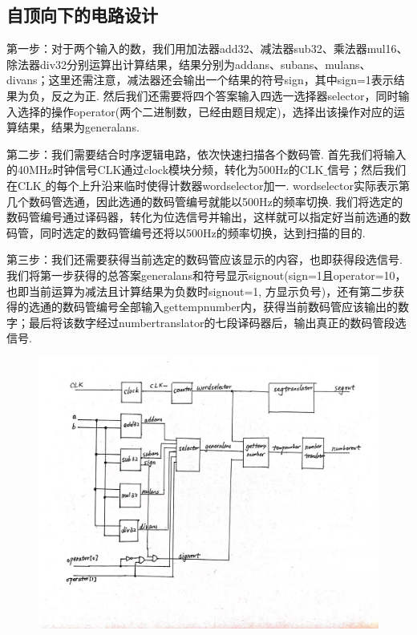 \documentclass[UTF8]{ctexart}
\begin{document}
\subsection{自顶向下的电路设计}
第一步：对于两个输入的数，我们用加法器add32、减法器sub32、乘法器mul16、除法器div32分别运算出计算结果，结果分别为addans、subans、mulans、divans；这里还需注意，减法器还会输出一个结果的符号sign，其中sign=1表示结果为负，反之为正. 然后我们还需要将四个答案输入四选一选择器selector，同时输入选择的操作operator(两个二进制数，已经由题目规定)，选择出该操作对应的运算结果，结果为generalans.\par
第二步：我们需要结合时序逻辑电路，依次快速扫描各个数码管. 首先我们将输入的40MHz时钟信号CLK通过clock模块分频，转化为500Hz的CLK$\_$信号；然后我们在CLK$\_$的每个上升沿来临时使得计数器wordselector加一. wordselector实际表示第几个数码管选通，因此选通的数码管编号就能以500Hz的频率切换. 我们将选定的数码管编号通过译码器，转化为位选信号并输出，这样就可以指定好当前选通的数码管，同时选定的数码管编号还将以500Hz的频率切换，达到扫描的目的.\par
第三步：我们还需要获得当前选定的数码管应该显示的内容，也即获得段选信号. 我们将第一步获得的总答案generalans和符号显示signout(sign=1且operator=10，也即当前运算为减法且计算结果为负数时signout=1, 方显示负号)，还有第二步获得的选通的数码管编号全部输入gettempnumber内，获得当前数码管应该输出的数字；最后将该数字经过numbertranslator的七段译码器后，输出真正的数码管段选信号.
\begin{figure}[H]\begin{center}
    \includegraphics[scale=0.12]{1.jpg}
\end{center}\end{figure}
\end{document}
